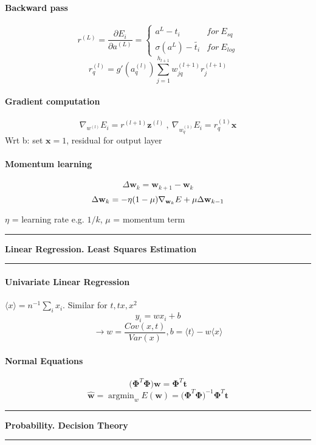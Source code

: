 \documentclass[7pt]{scrartcl}
\newlength{\secskip}
\renewcommand{\section}[1]{
  \vspace{\secskip}
  \hrule\vspace{.4em}
  \textbf{#1}
  \vspace{.4em}
  \hrule
  \vspace{\secskip}
}
\DeclareMathOperator*{\argmin}{argmin}
\renewcommand{\vec}{\mathbf}
\begin{document}
\begin{multicols}{4}
\paragraph{Backward pass}
\[r^{(L)}=\frac{\partial E_i}{\partial a^{(L)}} = \left\{ \begin{array}{ll}a^L - t_i & for~ E_{sq}  \\ \sigma(a^L) - \tilde{t_i} & for~ E_{log} \end{array} \right. \]
\[r_q^{(l)}=g'(a_q^{(l)})\sum_{j=1}^{h_{l+1}}w_{jq}^{(l+1)}r_j^{(l+1)}\]

\paragraph{Gradient computation}
\[\nabla_{w^{(l)}} E_i = r^{(l+1)} \vec{z}^{(l)} ~,~\nabla_{w_q^{(1)}} E_i = r_q^{(1)} \vec{x}\]
Wrt b: set $\vec{x} = 1$, residual for output layer

\paragraph{Momentum learning}
\[\Delta \vec w_k = \vec w_{k+1}-\vec w_k\]
\[\Delta \vec w_k = -\eta(1-\mu)\nabla_{\textbf w_k}E+\mu \Delta \vec w_{k-1}\]

$\eta$ = learning rate e.g. $1/k$, $\mu$ = momentum term

\section{Linear Regression. Least Squares Estimation}
\paragraph{Univariate Linear Regression}
$\langle x \rangle = n^{-1} \sum_i x_i $. Similar for $t, tx, x^2$
\[y_i = wx_i + b \]
\[\rightarrow w=\frac{Cov(x,t)}{Var(x)}, b=\langle t \rangle - w \langle x \rangle \]

\paragraph{Normal Equations}
\[ \vec{(\Phi}^{T}\vec{\Phi) w = \Phi}^{T} \vec{t}\]
\[ \hat{\vec{w}} = \argmin_w E(\vec{w}) = \vec{(\Phi}^{T}\vec{\Phi)}^{-1} \vec{\Phi}^{T}  \vec{t} \]

\section{Probability. Decision Theory}

\end{multicols}
\end{document}
